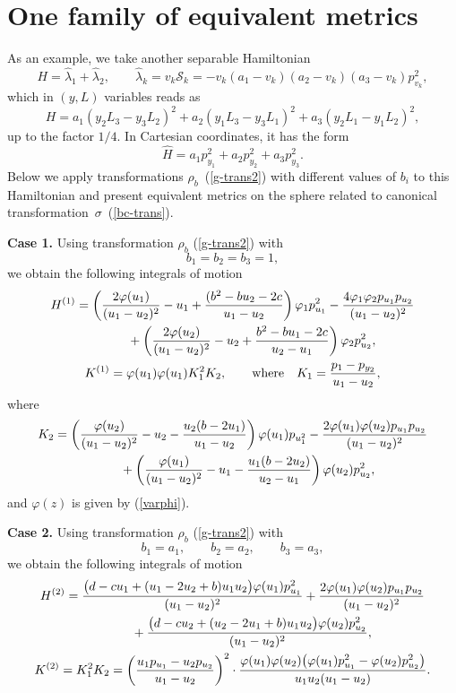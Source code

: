 \documentclass[10pt,a4paper]{amsart}
\numberwithin{equation}{section}
\begin{document}
\section{One family of equivalent metrics}

As an example, we take another separable Hamiltonian
\[
H=\hat{\lambda}_1+\hat{\lambda}_2 ,\qquad \hat{\lambda}_k=v_k\mathcal{S}_k=-v_k(a_1-v_k)(a_2-v_k)(a_3-v_k)p_{v_k}^2 ,
\]
which in $(y,L)$ variables reads as
\[H=a_1(y_2L_3-y_3L_2)^2 + a_2(y_1L_3-y_3L_1)^2 + a_3(y_2L_1 -y_1L_2)^2 ,\]
up to the factor $1/4$. In Cartesian coordinates, it has the form
\[
\hat{H}=a_1p_{y_1}^2+a_2p_{y_2}^2+a_3p_{y_3}^2 .
\]
Below we apply transformations $\rho_b$~(\ref{g-trans2}) with different values of $b_i$ to this Hamiltonian and present equivalent metrics on the sphere related to canonical transformation~$\sigma$~(\ref{bc-trans}).

\textbf{Case 1.} Using transformation $\rho_b$ (\ref{g-trans2}) with
\[b_1=b_2=b_3=1,\]
we obtain the following integrals of motion
\begin{gather}
H^{(1)}= \left(\dfrac{2\varphi(u_1)}{(u_1-u_2)^2} - u_1 +\dfrac{(b^2 - bu_2 - 2c}{u_1-u_2}\right)\varphi_1p_{u_1}^2-\dfrac{4\varphi_1\varphi_2 p_{u_1}p_{u_2}}{(u_1-u_2 )^2}
\nonumber \\
\hphantom{H^{(1)}=}{}  + \left(\dfrac{2\varphi(u_2)}{(u_1 -u_2)^2} - u_2 +\dfrac{b^2 - bu_1 - 2c}{u_2-u_1}\right)\varphi_2p_{u_2}^2,\label{case1} \\
K^{(1)}= \varphi(u_1)\varphi(u_1) K_1^2 K_2 ,\qquad\text{where}\quad K_1=\dfrac{p_1-p_{y_2}}{u_1-u_2} ,\nonumber
\end{gather}
where
\begin{gather*}
K_2= \left(\dfrac{\varphi(u_2)}{(u_1-u_2)^2} - u_2 - \frac{u_2(b - 2u_1)}{u_1-u_2}\right)\varphi(u_1)p_{u_1^2}
 -\dfrac{ 2\varphi(u_1)\varphi(u_2)p_{u_1}p_{u_2}}{(u_1-u_2)^2} \\
 \hphantom{K_2=}{}
 +  \left(\dfrac{\varphi(u_1)}{(u_1-u_2)^2} - u_1 -\frac{u_1(b - 2u_2)}{u_2-u_1}\right)\varphi(u_2)p_{u_2}^2 ,
\end{gather*}
and $\varphi(z)$ is given by (\ref{varphi}).

\textbf{Case 2.} Using transformation $\rho_b$ (\ref{g-trans2}) with
\[b_1=a_1,\qquad b_2=a_2,\qquad b_3=a_3,\]
 we obtain the following integrals of motion
 \begin{gather}
 H^{(2)}=
 \dfrac{\bigl(d - cu_1 + (u_1 - 2u_2 + b)u_1u_2\bigr)\varphi(u_1)p_{u_1}^2}{(u_1-u_2)^2}
 + \dfrac{ 2\varphi(u_1)\varphi(u_2)p_{u_1}p_{u_2}}{(u_1-u_2)^2}\nonumber\\
\hphantom{H^{(2)}=}{}
 + \dfrac{\bigl(d - cu_2 + (u_2 - 2u_1 + b)u_1u_2\bigr)\varphi(u_2)p_{u_2}^2}{(u_1-u_2)^2} ,\nonumber\\
 K^{(2)}=K_1^2K_2=\left( \dfrac{u_1p_{u_1}-u_2p_{u_2}}{u_1-u_2}\right)^2\cdot \dfrac{\varphi(u_1)\varphi(u_2)\bigl(\varphi(u_1)p_{u_1}^2 - \varphi(u_2)p_{u_2}^2\bigr)}{u_1u_2(u_1 - u_2)} . \label{case2}
\end{gather}
\end{document}
